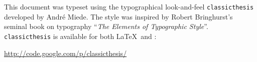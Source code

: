 \pagestyle{empty}


\hfill

\vfill

\begingroup
\noindent This document was typeset using the typographical look-and-feel \texttt{classicthesis} developed by Andr\'e Miede.
The style was inspired by Robert Bringhurst's seminal book on typography ``\emph{The Elements of Typographic Style}''.
\texttt{classicthesis} is available for both \LaTeX\ and \mLyX:
\begin{center}
\url{http://code.google.com/p/classicthesis/}
\end{center}

\bigskip

\noindent\finalVersionString
\endgroup

